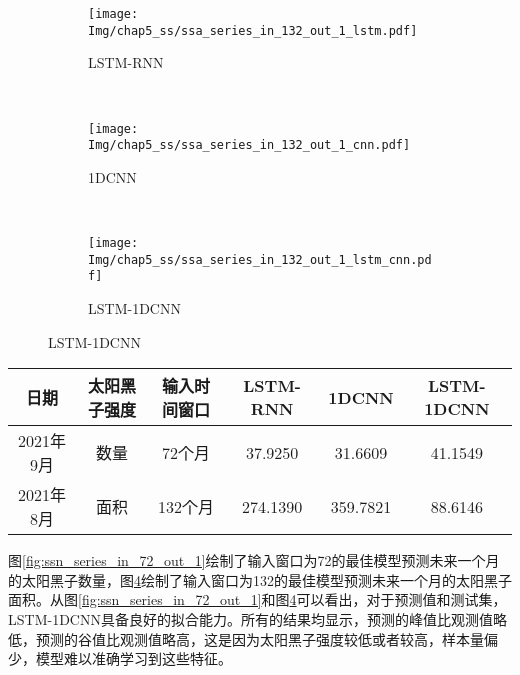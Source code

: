 \begin{figure}[!htbp]
  \centering
  \begin{subfigure}[b]{1.0\textwidth}
    \caption{LSTM-RNN} 
    \vspace{-0.35cm}
    \texttt{[image: Img/chap5\_ss/ssa\_series\_in\_132\_out\_1\_lstm.pdf]}
    \label{fig:ssa_series_in_132_out_1_lstm}
  \end{subfigure}    \\
  \vspace{-1cm}
  \begin{subfigure}[b]{1.0\textwidth}
    \caption{1DCNN}
    \vspace{-0.35cm}
    \texttt{[image: Img/chap5\_ss/ssa\_series\_in\_132\_out\_1\_cnn.pdf]}
    \label{fig:ssa_series_in_132_out_1_cnn}
  \end{subfigure} \\
  \vspace{-1cm}
  \begin{subfigure}[b]{1.0\textwidth}
    \caption{LSTM-1DCNN}
    \vspace{-0.35cm}
    \texttt{[image: Img/chap5\_ss/ssa\_series\_in\_132\_out\_1\_lstm\_cnn.pdf]}
    \label{fig:ssa_series_in_132_out_1_lstm_cnn}
    \end{subfigure}
  \vspace{-2cm}
  \label{fig:ssa_series_in_132_out_1}
\end{figure}

\begin{table}[!htbp]
\centering
{}
\label{tab:ss_out_1}
\footnotesize
\begin{tabular}{cccccc}
    \toprule
    日期 & 太阳黑子强度 & 输入时间窗口 & LSTM-RNN & 1DCNN & LSTM-1DCNN  \\
    \midrule
    2021年9月 & 数量 & 72个月 & 37.9250 & 31.6609 & 41.1549 \\
    2021年8月 & 面积 & 132个月 & 274.1390 & 359.7821 & 88.6146 \\
    \bottomrule
\end{tabular}
\end{table}

图\ref{fig:ssn_series_in_72_out_1}绘制了输入窗口为72的最佳模型预测未来一个月的太阳黑子数量，图\ref{fig:ssa_series_in_132_out_1}绘制了输入窗口为132的最佳模型预测未来一个月的太阳黑子面积。从图\ref{fig:ssn_series_in_72_out_1}和图\ref{fig:ssa_series_in_132_out_1}可以看出，对于预测值和测试集，LSTM-1DCNN具备良好的拟合能力。所有的结果均显示，预测的峰值比观测值略低，预测的谷值比观测值略高，这是因为太阳黑子强度较低或者较高，样本量偏少，模型难以准确学习到这些特征。





